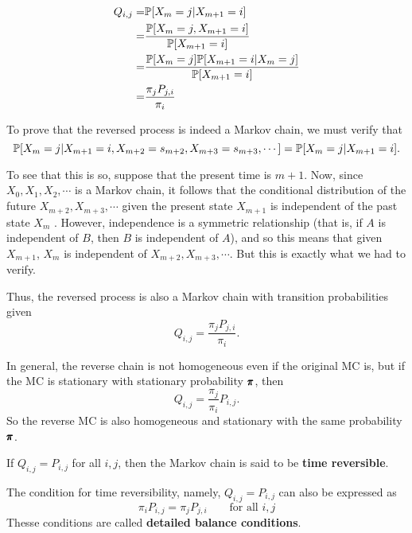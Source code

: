 \begin{align*}
    Q_{i,j} = & \mathbb{P} [X_m = j | X_{m+1} = i] \\ 
    = & \frac{\mathbb{P} [X_m = j, X_{m+1} = i]}{\mathbb{P} [X_{m+1} = i]} \\ 
    = & \frac{\mathbb{P}[X_m = j] \mathbb{P} [X_{m+1} = i | X_m = j]}{\mathbb{P} [X_{m+1} = i]} \\ 
    = & \frac{\pi_j P_{j,i}}{\pi_i}
\end{align*}

To prove that the reversed process is indeed a Markov chain, we must verify that
$$
\mathbb{P} [X_m = j | X_{m+1} = i, X_{m+2} = s_{m+2}, X_{m+3} = s_{m+3}, \cdots] = \mathbb{P} [X_m = j | X_{m+1} = i].$$

To see that this is so, suppose that the present time is $m + 1$. Now, since $X_0 , X_1 , X_2 , \cdots$
is a Markov chain, it follows that the conditional distribution of the future $X_{m+2} ,
X_{m+3} , \cdots$ given the present state $X_{m+1}$ is independent of the past state $X_m$ . However, independence is a symmetric relationship (that is, if $A$ is independent of $B$, then
$B$ is independent of $A$), and so this means that given $X_{m+1}$, $X_{m}$ is independent of
$X_{m+2} , X_{m+3} , \cdots$. But this is exactly what we had to verify.

Thus, the reversed process is also a Markov chain with transition probabilities given
$$
Q_{i,j} = \frac{\pi_j P_{j,i}}{\pi_i}.$$

\begin{remark}
    In general, the reverse chain is not homogeneous even if the original MC is, but if the MC is stationary with stationary probability $\pmb{\pi}$, then 
    $$
    Q_{i,j} = \frac{\pi_j}{\pi_i}P_{i,j}.
    $$
    So the reverse MC is also homogeneous and stationary with the same probability $\pmb{\pi}$.
\end{remark}

\begin{definition}
    If $Q_{i,j} = P_{i,j}$ for all $i,j$, then the Markov chain is said to be \textbf{time reversible}. 
\end{definition}

\begin{definition}
    The condition for time reversibility, namely, $Q_{i,j} = P_{i,j}$ can also be expressed as 
    \begin{equation}
    \pi_i P_{i,j} = \pi_j P_{j, i} \qquad \text{for all } i, j \label{eq 4.21}
    \end{equation}
    Thesse conditions are called \textbf{detailed balance conditions}.
\end{definition}


